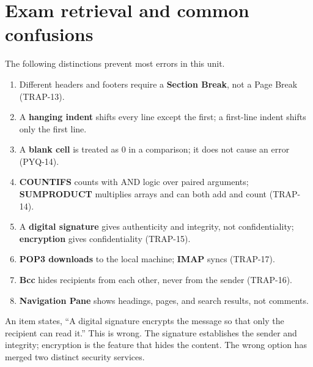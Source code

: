 \section{Exam retrieval and common confusions}
The following distinctions prevent most errors in this unit.
\begin{enumerate}
  \item Different headers and footers require a \textbf{Section Break}, not a
    Page Break (TRAP-13).
  \item A \textbf{hanging indent} shifts every line except the first; a
    first-line indent shifts only the first line.
  \item A \textbf{blank cell} is treated as 0 in a comparison; it does not
    cause an error (PYQ-14).
  \item \textbf{COUNTIFS} counts with AND logic over paired arguments;
    \textbf{SUMPRODUCT} multiplies arrays and can both add and count
    (TRAP-14).
  \item A \textbf{digital signature} gives authenticity and integrity, not
    confidentiality; \textbf{encryption} gives confidentiality (TRAP-15).
  \item \textbf{POP3 downloads} to the local machine; \textbf{IMAP} syncs
    (TRAP-17).
  \item \textbf{Bcc} hides recipients from each other, never from the sender
    (TRAP-16).
  \item \textbf{Navigation Pane} shows headings, pages, and search results,
    not comments.
\end{enumerate}

\begin{example}
An item states, ``A digital signature encrypts the message so that only the
recipient can read it.'' This is wrong. The signature establishes the sender
and integrity; encryption is the feature that hides the content. The wrong
option has merged two distinct security services.
\end{example}

